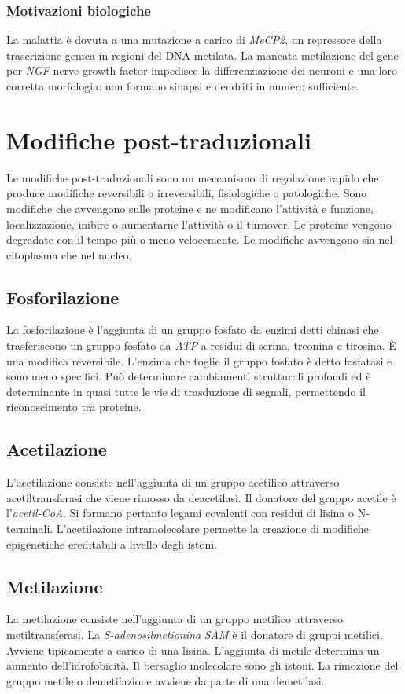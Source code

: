 		\subsubsection{Motivazioni biologiche}
		La malattia \`e dovuta a una mutazione a carico di \emph{MeCP2}, un repressore della trascrizione genica in regioni del DNA metilata.
		La mancata metilazione del gene per \emph{NGF} nerve growth factor impedisce la differenziazione dei neuroni e una loro corretta morfologia: non formano sinapsi e dendriti in numero sufficiente.

\section{Modifiche post-traduzionali}
Le modifiche post-traduzionali sono un meccanismo di regolazione rapido che produce modifiche reversibili o irreversibili, fisiologiche o patologiche.
Sono modifiche che avvengono sulle proteine e ne modificano l'attivit\`a e funzione, localizzazione, inibire o aumentarne l'attivit\`a o il turnover. 
Le proteine vengono degradate con il tempo pi\`u o meno velocemente.
Le modifiche avvengono sia nel citoplasma che nel nucleo.

	\subsection{Fosforilazione}
	La fosforilazione \`e l'aggiunta di un gruppo fosfato da enzimi detti chinasi che trasferiscono un gruppo fosfato da \emph{ATP} a residui di serina, treonina e tirosina.
	\`E una modifica reversibile. 
	L'enzima che toglie il gruppo fosfato \`e detto fosfatasi e sono meno specifici.
	Pu\`o determinare cambiamenti strutturali profondi ed \`e determinante in quasi tutte le vie di trasduzione di segnali, permettendo il riconoscimento tra proteine.

	\subsection{Acetilazione}
	L'acetilazione consiste nell'aggiunta di un gruppo acetilico attraverso acetiltransferasi che viene rimosso da deacetilasi. 
	Il donatore del gruppo acetile \`e l'\emph{acetil-CoA}.
	Si formano pertanto legami covalenti con residui di lisina o N-terminali.
	L'acetilazione intramolecolare permette la creazione di modifiche epigenetiche ereditabili a livello degli istoni.


	\subsection{Metilazione}
	La metilazione consiste nell'aggiunta di un gruppo metilico attraverso metiltransferasi.
	La \emph{S-adenosilmetionina} \emph{SAM} \`e il donatore di gruppi metilici.
	Avviene tipicamente a carico di una lisina.
	L'aggiunta di metile determina un aumento dell'idrofobicit\`a.
	Il bersaglio molecolare sono gli istoni.
	La rimozione del gruppo metile o demetilazione avviene da parte di una demetilasi.


